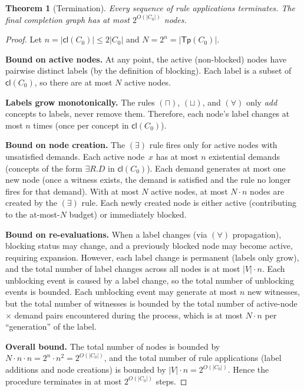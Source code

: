 \documentclass[a4paper,11pt]{article}
\newtheorem{theorem}{Theorem}[section]
\theoremstyle{definition}
\newcommand{\cl}{\ensuremath{\mathsf{cl}}}
\newcommand{\Tp}{\ensuremath{\mathsf{Tp}}}
\begin{document}
\begin{theorem}[Termination]
\label{thm:termination}
Every sequence of rule applications terminates.  The final completion
graph has at most $2^{O(|C_0|)}$ nodes.
\end{theorem}

\begin{proof}
Let $n = |\cl(C_0)| \leq 2|C_0|$ and $N = 2^n = |\Tp(C_0)|$.

\smallskip\noindent\textbf{Bound on active nodes.}\; At any point,
the active (non-blocked) nodes have pairwise distinct labels (by the
definition of blocking).  Each label is a subset of $\cl(C_0)$, so
there are at most $N$ active nodes.

\smallskip\noindent\textbf{Labels grow monotonically.}\; The rules
$(\sqcap)$, $(\sqcup)$, and $(\forall)$ only \emph{add} concepts to
labels, never remove them.  Therefore, each node's label changes at
most $n$ times (once per concept in $\cl(C_0)$).

\smallskip\noindent\textbf{Bound on node creation.}\; The $(\exists)$
rule fires only for active nodes with unsatisfied demands.  Each
active node~$x$ has at most $n$ existential demands (concepts of the
form $\exists R.D$ in $\cl(C_0)$).  Each demand generates at most one
new node (once a witness exists, the demand is satisfied and the rule
no longer fires for that demand).  With at most $N$ active nodes, at
most $N \cdot n$ nodes are created by the $(\exists)$ rule.  Each
newly created node is either active (contributing to the at-most-$N$
budget) or immediately blocked.

\smallskip\noindent\textbf{Bound on re-evaluations.}\; When a label
changes (via $(\forall)$ propagation), blocking status may change, and
a previously blocked node may become active, requiring expansion.
However, each label change is permanent (labels only grow), and the
total number of label changes across all nodes is at most $|V| \cdot
n$.  Each unblocking event is caused by a label change, so the total
number of unblocking events is bounded.  Each unblocking event may
generate at most $n$ new witnesses, but the total number of witnesses
is bounded by the total number of active-node $\times$ demand pairs
encountered during the process, which is at most $N \cdot n$ per
``generation'' of the label.

\smallskip\noindent\textbf{Overall bound.}\; The total number of
nodes is bounded by $N \cdot n \cdot n = 2^n \cdot n^2 =
2^{O(|C_0|)}$, and the total number of rule applications (label
additions and node creations) is bounded by $|V| \cdot n =
2^{O(|C_0|)}$.  Hence the procedure terminates in at most
$2^{O(|C_0|)}$ steps.
\end{proof}
\end{document}
